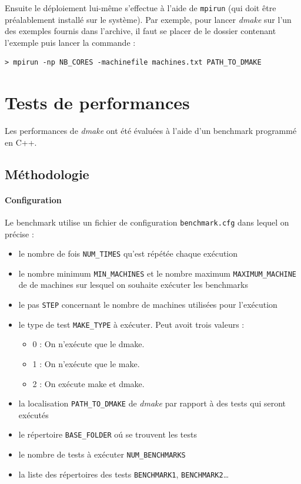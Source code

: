 \documentclass[a4paper,12pt,twoside]{article}
\begin{document}
Ensuite le déploiement lui-même s'effectue à l'aide de
\texttt{mpirun} (qui doit être préalablement installé sur le système). Par exemple, pour lancer \emph{dmake} sur l'un des
exemples fournis dans l'archive, il faut se placer de le dossier
contenant l'exemple puis lancer la commande :
\begin{verbatim}
> mpirun -np NB_CORES -machinefile machines.txt PATH_TO_DMAKE
\end{verbatim}



\section{Tests de performances}

Les performances de \emph{dmake} ont été évaluées à l'aide d'un
benchmark programmé en C++.

\subsection{Méthodologie}

\paragraph{Configuration}
Le benchmark utilise un fichier de configuration
\texttt{benchmark.cfg} dans lequel on précise : 
\begin{itemize}
\item le nombre de fois
\texttt{NUM\_TIMES} qu'est répétée chaque exécution
\item  le nombre minimum \texttt{MIN\_MACHINES}
et le nombre maximum \texttt{MAXIMUM\_MACHINE} de de machines 
sur lesquel on souhaite exécuter les benchmarks
\item le pas \texttt{STEP} concernant le nombre de machines utilisées
  pour l'exécution
\item le type de test \texttt{MAKE\_TYPE} à exécuter. Peut avoit trois valeurs :
	\begin{itemize}
	\item  0 : On n'exécute que le dmake.
	\item  1 : On n'exécute que le make.
	\item  2 : On exécute make et dmake.
	\end{itemize}
\item la localisation \texttt{PATH\_TO\_DMAKE} de \emph{dmake}
par rapport à des tests qui seront exécutés
\item le répertoire \texttt{BASE\_FOLDER} oú se trouvent les tests
\item le nombre de tests à exécuter \texttt{NUM\_BENCHMARKS}
\item la liste des répertoires des tests \texttt{BENCHMARK1}, \texttt{BENCHMARK2}\dots
\end{itemize}
\end{document}
